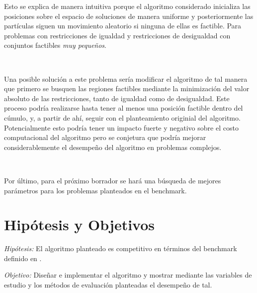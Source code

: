 \documentclass{article}
\begin{document}
Esto se explica de manera intuitiva porque el algoritmo considerado inicializa las posiciones sobre el espacio de soluciones de manera uniforme y posteriormente las partículas siguen un movimiento aleatorio si ninguna de ellas es factible. Para problemas con restricciones de igualdad y restricciones de desigualdad con conjuntos factibles \textit{muy pequeños}. 

\

Una posible solución a este problema sería modificar el algoritmo de tal manera que primero se busquen las regiones factibles mediante la minimización del valor absoluto de las restricciones, tanto de igualdad como de desigualdad. Este proceso podría realizarse hasta tener al menos una posición factible dentro del cúmulo, y, a partir de ahí, seguir con el planteamiento originial del algoritmo. Potencialmente esto podría tener un impacto fuerte y negativo sobre el costo computacional del algoritmo pero se conjetura que podría mejorar considerablemente el desempeño del algoritmo en problemas complejos.

\

Por último, para el próximo borrador se hará una búsqueda de mejores parámetros para los problemas planteados en el benchmark. 

\newpage
\section*{Hipótesis y Objetivos}

\textit{Hipótesis:} El algoritmo planteado es competitivo en términos del benchmark definido en \cite{suganthan16}. 

\textit{Objetivo: } Diseñar e implementar el algoritmo y mostrar mediante las variables de estudio y los métodos de evaluación planteadas el desempeño de tal.



\newpage

 
\end{document}
